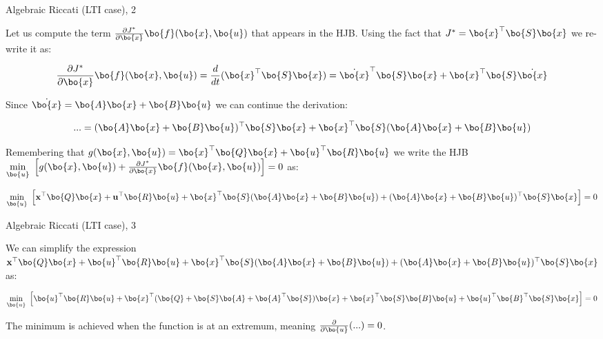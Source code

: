 \documentclass{beamer}
\begin{document}
\begin{frame}{Algebraic Riccati (LTI case), 2}
\begin{flushleft}

Let us compute the term $\frac{\partial J^*}{\partial \bo{x}} \bo{f} (\bo{x}, \bo{u}) $ that appears in the HJB. Using the fact that $J^* =\bo{x}^\top \bo{S} \bo{x}$ we re-write it as:

\begin{equation}
	\frac{\partial J^*}{\partial \bo{x}} \bo{f} (\bo{x}, \bo{u}) = \frac{d}{dt}(\bo{x}^\top \bo{S}\bo{x})
	=
	\dot{\bo{x}}^\top \bo{S}\bo{x} + \bo{x}^\top \bo{S}\dot{\bo{x}} 
\end{equation}

Since $\dot {\bo{x}} = \bo{A}  \bo{x} + \bo{B} \bo{u}$ we can continue the derivation:

\begin{equation}
	... =
	(\bo{A}  \bo{x} + \bo{B} \bo{u})^\top \bo{S}\bo{x} + \bo{x}^\top \bo{S}(\bo{A}  \bo{x} + \bo{B} \bo{u})
\end{equation}


\bigskip

Remembering that $g(\bo{x}, \bo{u} ) = 
\bo{x}^\top \bo{Q} \bo{x} +
\bo{u} ^\top \bo{R} \bo{u}$ we write the HJB $\underset{\bo{u}}{\min} \ 
\left[ 
g(\bo{x}, \bo{u}) + 
\frac{\partial J^*}{\partial \bo{x}} \bo{f} (\bo{x}, \bo{u}) 
\right] = 0$ as:

\[
\underset{\bo{u}}{\min} \ 
\left [ 
\mathbf  x^\top \bo{Q} \bo{x} +
\mathbf  u^\top \bo{R} \bo{u}
+ 
\bo{x}^\top \bo{S}
(\bo{A} \bo{x} + \bo{B} \bo{u}) 
+ 
(\bo{A} \bo{x} + \bo{B} \bo{u})^\top
\bo{S} \bo{x}
\right ] = 0
\]

\end{flushleft}
\end{frame}






\begin{frame}{Algebraic Riccati (LTI case), 3}
	\begin{flushleft}
		
		We can simplify the expression $\mathbf  x^\top \bo{Q} \bo{x} +
		\bo{u}^\top \bo{R} \bo{u}
		+ 
		\bo{x}^\top \bo{S}
		(\bo{A} \bo{x} + \bo{B} \bo{u}) 
		+ 
		(\bo{A} \bo{x} + \bo{B} \bo{u})^\top
		\bo{S} \bo{x}$ as:


		\[
		\underset{\bo{u}}{\min} \ 
		\left [ 
		\bo{u}^\top \bo{R} \bo{u}
		+ 
		\bo{x}^\top (
		\bo{Q} + \bo{S} \bo{A} + \bo{A}^\top \bo{S}
		)\bo{x}
		+ 
		\bo{x}^\top \bo{S} \bo{B} \bo{u} 
		+ \bo{u}^\top \bo{B}^\top \bo{S} \bo{x} 
		\right ] = 0
		\]
		
		
		\bigskip
		
		The minimum is achieved when the function is at an extremum, meaning $\frac{\partial}{\partial \bo{u}} (...) = 0$.
		
	\end{flushleft}
\end{frame}
\end{document}
